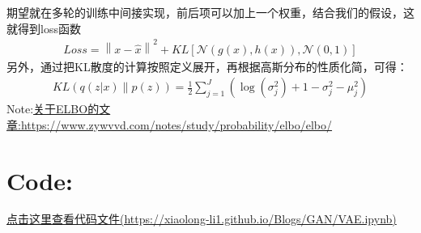 \documentclass[]{report}
\begin{document}
\FloatBarrier
期望就在多轮的训练中间接实现，前后项可以加上一个权重，结合我们的假设，这就得到loss函数
\begin{align}
	Loss = \left\|x - \hat{x}\right\|^{2} + KL\left[\mathcal{N}(g(x), h(x)), \mathcal{N}(0, 1)\right]
\end{align}
另外，通过把KL散度的计算按照定义展开，再根据高斯分布的性质化简，可得：
\begin{align}
	KL(q(z|x) \parallel p(z)) = \frac{1}{2} \sum_{j=1}^{J} \left( \log(\sigma_j^2) + 1 - \sigma_j^2 - \mu_j^2 \right)
\end{align}
Note:\href{https://www.zywvvd.com/notes/study/probability/elbo/elbo/}{关于ELBO的文章:https://www.zywvvd.com/notes/study/probability/elbo/elbo/}
\section{Code:}
\href{./VAE.ipynb}{点击这里查看代码文件(https://xiaolong-li1.github.io/Blogs/GAN/VAE.ipynb)}
\end{document}
